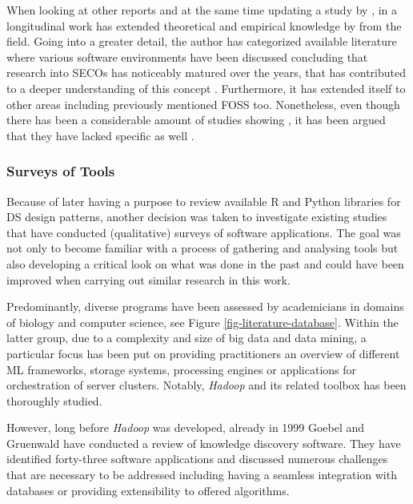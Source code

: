 When looking at other reports and at the same time updating a study by \textcite{HansenManikas2013}, in a longitudinal work \textcite[2]{Manikas2016RevisitingStudy} has extended theoretical and empirical knowledge by  from the field.
Going into a greater detail, the author has categorized available literature where various software environments have been discussed concluding that research into \acp{SECO} has noticeably matured over the years,  that has contributed to a deeper understanding of this concept \parencite[2]{Manikas2016RevisitingStudy}.
Furthermore, it has extended itself to other areas including previously mentioned \acs{FOSS} too.
Nonetheless, even though there has been a considerable amount of studies showing , it has been argued that they have lacked specific  as well \parencite[28]{Manikas2016RevisitingStudy}.

\subsubsection{Surveys of Tools}
\label{surveyofTools}
Because of later having a purpose to review available R and Python libraries for \ac{DS} design patterns, another decision was taken to investigate existing studies that have conducted (qualitative) surveys of software applications.
The goal was not only to become familiar with a process of gathering and analysing tools but also developing a critical look on what was done in the past and could have been improved when carrying out similar research in this work. 

Predominantly, diverse programs have been assessed by academicians in domains of biology and computer science, see Figure \ref{fig-literature-database}. 
Within the latter group, due to a complexity and size of big data and data mining, a particular focus has been put on providing practitioners an overview of different \ac{ML} frameworks, storage systems, processing engines or applications for orchestration of server clusters. 
Notably, \emph{Hadoop} and its related toolbox has been thoroughly studied. 

However, long before \emph{Hadoop} was developed, already in 1999 Goebel and Gruenwald have conducted a review of knowledge discovery software.
They have identified forty-three software applications and discussed numerous challenges that are necessary to be addressed including having a seamless integration with databases or providing extensibility to offered algorithms.

